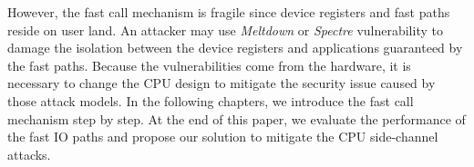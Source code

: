 However, the fast call mechanism is fragile since device registers and fast paths reside on user land. 
An attacker may use \emph{Meltdown} or \emph{Spectre} vulnerability to damage the isolation between the device registers 
and applications guaranteed by the fast paths. Because the vulnerabilities come from the hardware, it is 
necessary to change the CPU design to mitigate the security issue caused by those attack models. In the 
following chapters, we introduce the fast call mechanism step by step. At the end of this paper, we 
evaluate the performance of the fast IO paths and propose our solution to mitigate the CPU side-channel attacks.
\cleardoublepage

